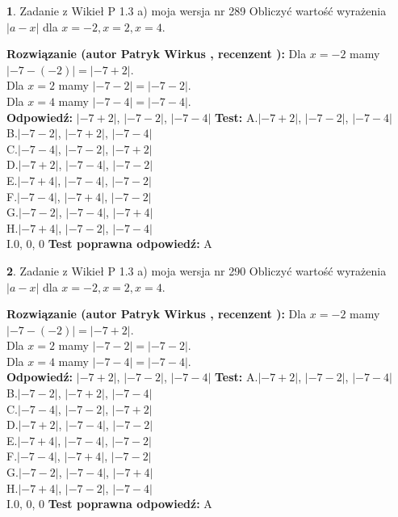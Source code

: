 \documentclass[12pt, a4paper]{article}
\theoremstyle{definition} %
\newtheorem{zad}{}
\newcommand{\zadStart}[1]{\begin{zad}#1\newline}
\newcommand{\zadStop}{\end{zad}}
\newcommand{\rozwStart}[2]{\noindent \textbf{Rozwiązanie (autor #1 , recenzent #2): }\newline}
\newcommand{\rozwStop}{\newline}
\newcommand{\odpStart}{\noindent \textbf{Odpowiedź:}\newline}
\newcommand{\odpStop}{\newline}
\newcommand{\testStart}{\noindent \textbf{Test:}\newline}
\newcommand{\testStop}{\newline}
\newcommand{\kluczStart}{\noindent \textbf{Test poprawna odpowiedź:}\newline}
\newcommand{\kluczStop}{\newline}
\begin{document}
\zadStart{Zadanie z Wikieł P 1.3 a) moja wersja nr 289}
Obliczyć wartość wyrażenia $|a - x|$ dla $x=-2,x=2,x=4$.
\zadStop
\rozwStart{Patryk Wirkus}{}
Dla $x = -2$ mamy $|-7 - (-2)| = |-7 + 2|$.\\
Dla $x = 2$ mamy $|-7 - 2| = |-7 - 2|$.\\
Dla $x = 4$ mamy $|-7 - 4| = |-7 - 4|$.\\
\rozwStop
\odpStart
$|-7 + 2|$, $|-7 - 2|$, $|-7 - 4|$
\odpStop
\testStart
A.$|-7 + 2|$, $|-7 - 2|$, $|-7 - 4|$\\
B.$|-7 - 2|$, $|-7 + 2|$, $|-7 - 4|$\\
C.$|-7 - 4|$, $|-7 - 2|$, $|-7 + 2|$\\
D.$|-7 + 2|$, $|-7 - 4|$, $|-7 - 2|$\\
E.$|-7 + 4|$, $|-7 - 4|$, $|-7 - 2|$\\
F.$|-7 - 4|$, $|-7 + 4|$, $|-7 - 2|$\\
G.$|-7 - 2|$, $|-7 - 4|$, $|-7 + 4|$\\
H.$|-7 + 4|$, $|-7 - 2|$, $|-7 - 4|$\\
I.$0$, $0$, $0$
\testStop
\kluczStart
A
\kluczStop



\zadStart{Zadanie z Wikieł P 1.3 a) moja wersja nr 290}
Obliczyć wartość wyrażenia $|a - x|$ dla $x=-2,x=2,x=4$.
\zadStop
\rozwStart{Patryk Wirkus}{}
Dla $x = -2$ mamy $|-7 - (-2)| = |-7 + 2|$.\\
Dla $x = 2$ mamy $|-7 - 2| = |-7 - 2|$.\\
Dla $x = 4$ mamy $|-7 - 4| = |-7 - 4|$.\\
\rozwStop
\odpStart
$|-7 + 2|$, $|-7 - 2|$, $|-7 - 4|$
\odpStop
\testStart
A.$|-7 + 2|$, $|-7 - 2|$, $|-7 - 4|$\\
B.$|-7 - 2|$, $|-7 + 2|$, $|-7 - 4|$\\
C.$|-7 - 4|$, $|-7 - 2|$, $|-7 + 2|$\\
D.$|-7 + 2|$, $|-7 - 4|$, $|-7 - 2|$\\
E.$|-7 + 4|$, $|-7 - 4|$, $|-7 - 2|$\\
F.$|-7 - 4|$, $|-7 + 4|$, $|-7 - 2|$\\
G.$|-7 - 2|$, $|-7 - 4|$, $|-7 + 4|$\\
H.$|-7 + 4|$, $|-7 - 2|$, $|-7 - 4|$\\
I.$0$, $0$, $0$
\testStop
\kluczStart
A
\kluczStop
\end{document}
